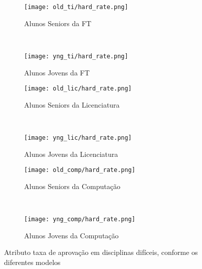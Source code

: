 \clearpage
\begin{figure}[!ht]
    \centering
    \begin{subfigure}[b]{0.48\textwidth}
        \centering
        \texttt{[image: old\_ti/hard\_rate.png]}
        \caption{Alunos Seniors da FT}
    \end{subfigure}
    ~
    \begin{subfigure}[b]{0.48\textwidth}
        \centering
        \texttt{[image: yng\_ti/hard\_rate.png]}
        \caption{Alunos Jovens da FT}
    \end{subfigure}

    \begin{subfigure}[b]{0.48\textwidth}
        \centering
        \texttt{[image: old\_lic/hard\_rate.png]}
        \caption{Alunos Seniors da Licenciatura}
    \end{subfigure}
    ~
    \begin{subfigure}[b]{0.48\textwidth}
        \centering
        \texttt{[image: yng\_lic/hard\_rate.png]}
        \caption{Alunos Jovens da Licenciatura}
    \end{subfigure}

    \begin{subfigure}[b]{0.48\textwidth}
        \centering
        \texttt{[image: old\_comp/hard\_rate.png]}
        \caption{Alunos Seniors da Computação}
    \end{subfigure}
    ~
    \begin{subfigure}[b]{0.48\textwidth}
        \centering
        \texttt{[image: yng\_comp/hard\_rate.png]}
        \caption{Alunos Jovens da Computação}
    \end{subfigure}
    \caption{Atributo taxa de aprovação em disciplinas difíceis, conforme os 
    diferentes modelos}
\end{figure}

